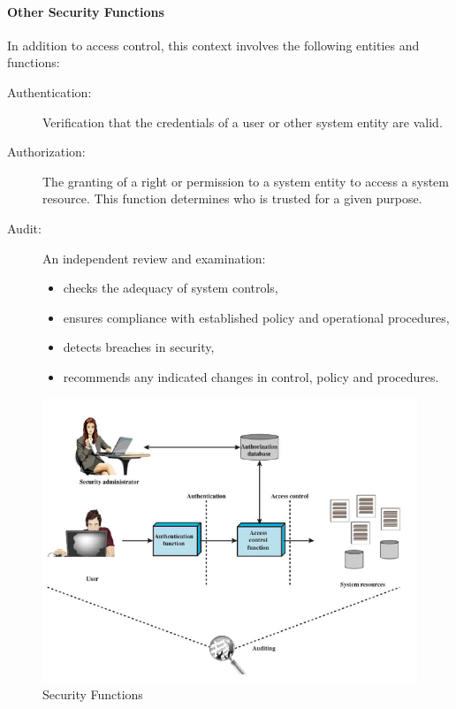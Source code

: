 \documentclass{article}
\begin{document}
                \paragraph{Other Security Functions}In addition to access control, this context involves the
                following entities and functions: 
                \begin{description}
                    \item[Authentication:] Verification that the credentials of a user or other system entity are valid.
                    \item[Authorization:] The granting of a right or permission to a system entity to access a system resource. This function determines who is trusted for a given purpose.
                    \item[Audit:] An independent review and examination:
                    \begin{itemize}
                        \item checks the adequacy of system controls,
                        \item ensures compliance with established policy and operational procedures,
                        \item detects breaches in security,
                        \item recommends any indicated changes in control, policy and procedures.
                    \end{itemize}
                \end{description}

                    \begin{figure}[h]
                        \begin{center}
                            \includegraphics[scale=0.5]{../immagini/security_functions.png}
                        \end{center}
                        \caption{Security Functions}
                    \end{figure}
                
\end{document}
